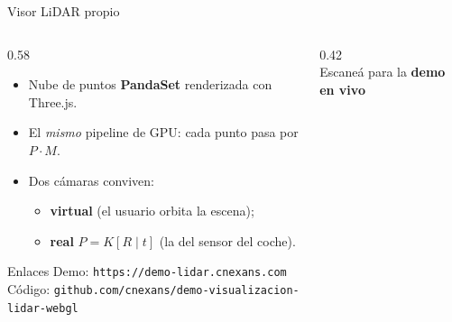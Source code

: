 \documentclass[aspectratio=169]{beamer}
\begin{document}
\begin{frame}{Visor LiDAR propio}
  \begin{columns}[T]
    \begin{column}{0.58\textwidth}
      \begin{itemize}
        \item Nube de puntos \textbf{PandaSet} renderizada con Three.js.
        \item El \emph{mismo} pipeline de GPU: cada punto pasa por
              $P\cdot M$.
        \item Dos cámaras conviven:
              \begin{itemize}
                \item \textbf{virtual} (el usuario orbita la escena);
                \item \textbf{real} $P=K[R\mid t]$ (la del sensor del coche).
              \end{itemize}
      \end{itemize}
      \vspace{0.2cm}
      \begin{block}{Enlaces}
        {\footnotesize
        Demo: \alert{\texttt{https://demo-lidar.cnexans.com}}\\
        Código: \texttt{github.com/cnexans/demo-visualizacion-lidar-webgl}}
      \end{block}
    \end{column}
    \begin{column}{0.42\textwidth}
      \centering
      \\[4pt]
      {\footnotesize\color{gris} Escaneá para la \textbf{demo en vivo}}
    \end{column}
  \end{columns}
\end{frame}
\end{document}
